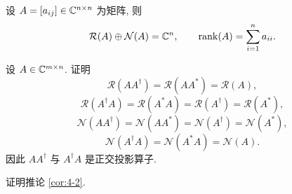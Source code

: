 \begin{exercises}
  \item 设 $A=[a_{ij}]\in\mathbb{C}^{n\times n}$ 为矩阵, 则
  \[
    \mathcal{R}(A)\oplus\mathcal{N}(A)=\mathbb{C}^n,\qquad
    \operatorname{rank}(A)=\sum_{i=1}^{n}a_{ii}.
  \]

  \item 设 $A\in\mathbb{C}^{m\times n}$. 证明
  \[
    \mathcal{R}(AA^{\dagger})=\mathcal{R}(AA^*)=\mathcal{R}(A),
  \]
  \[
    \mathcal{R}(A^{\dagger}A)=\mathcal{R}(A^*A)
    =\mathcal{R}(A^{\dagger})=\mathcal{R}(A^*),
  \]
  \[
    \mathcal{N}(AA^{\dagger})=\mathcal{N}(AA^*)
    =\mathcal{N}(A^{\dagger})=\mathcal{N}(A^*),
  \]
  \[
    \mathcal{N}(A^{\dagger}A)=\mathcal{N}(A^*A)=\mathcal{N}(A).
  \]
  因此 $AA^{\dagger}$ 与 $A^{\dagger}A$ 是正交投影算子.

  \item 证明推论 \ref{cor:4-2}.
\end{exercises}
